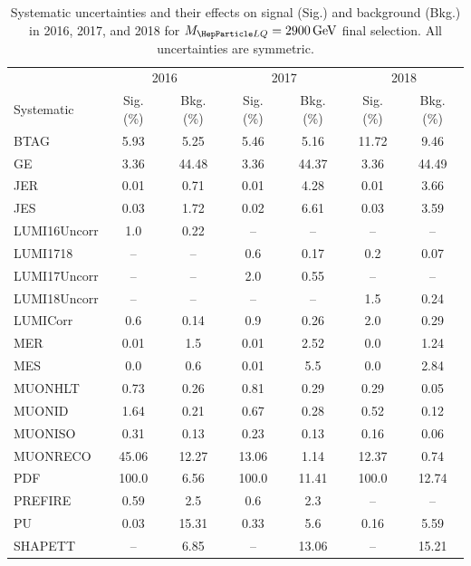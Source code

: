 \begin{table}[H]
	\begin{center}
        \begin{footnotesize}
			\caption{Systematic uncertainties and their effects on signal (Sig.) and background (Bkg.) in 2016, 2017, and 2018 for $\MLQ = \SI{2900}{GeV}$ final selection. All uncertainties are symmetric.}
			\begin{tabular}{lcccccc} \hline \hline
				& \multicolumn{2}{c}{2016} & \multicolumn{2}{c}{2017} & \multicolumn{2}{c}{2018} \\
				Systematic & Sig. (\%) & Bkg. (\%) & Sig. (\%) & Bkg. (\%) & Sig. (\%) & Bkg. (\%) \\ \hline
				BTAG &  5.93  &  5.25 &  5.46  &  5.16 &  11.72  &  9.46 \\
				GE &  3.36  &  44.48 &  3.36  &  44.37 &  3.36  &  44.49 \\
				JER &  0.01  &  0.71 &  0.01  &  4.28 &  0.01  &  3.66 \\
				JES &  0.03  &  1.72 &  0.02  &  6.61 &  0.03  &  3.59 \\
				LUMI16Uncorr &  1.0  &  0.22 & -- & -- & -- & -- \\
				LUMI1718 & -- & -- &  0.6  &  0.17 &  0.2  &  0.07 \\
				LUMI17Uncorr & -- & -- &  2.0  &  0.55 & -- & -- \\
				LUMI18Uncorr & -- & -- & -- & -- &  1.5  &  0.24 \\
				LUMICorr &  0.6  &  0.14 &  0.9  &  0.26 &  2.0  &  0.29 \\
				MER &  0.01  &  1.5 &  0.01  &  2.52 &  0.0  &  1.24 \\
				MES &  0.0  &  0.6 &  0.01  &  5.5 &  0.0  &  2.84 \\
				MUONHLT &  0.73  &  0.26 &  0.81  &  0.29 &  0.29  &  0.05 \\
				MUONID &  1.64  &  0.21 &  0.67  &  0.28 &  0.52  &  0.12 \\
				MUONISO &  0.31  &  0.13 &  0.23  &  0.13 &  0.16  &  0.06 \\
				MUONRECO &  45.06  &  12.27 &  13.06  &  1.14 &  12.37  &  0.74 \\
				PDF &  100.0  &  6.56 &  100.0  &  11.41 &  100.0  &  12.74 \\
				PREFIRE &  0.59  &  2.5 &  0.6  &  2.3 & -- & -- \\
				PU &  0.03  &  15.31 &  0.33  &  5.6 &  0.16  &  5.59 \\
				SHAPETT & -- &  6.85 & -- &  13.06 & -- &  15.21 \\

\end{tabular}
\end{footnotesize}
\end{center}
\end{table}
